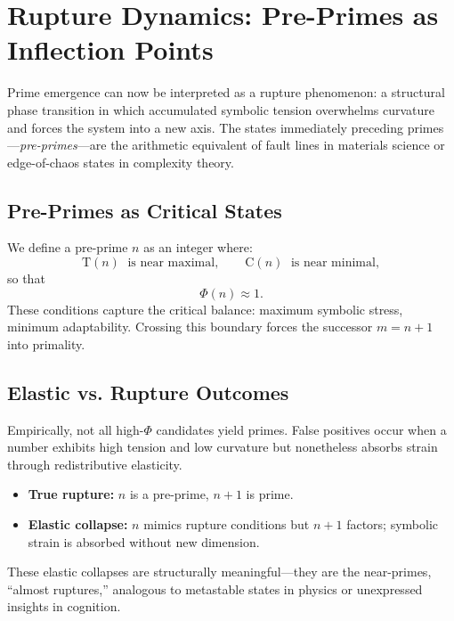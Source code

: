 \documentclass[11pt]{article}
\theoremstyle{plain}
\theoremstyle{definition}
\newcommand{\tension}{\mathrm{T}}                           %
\newcommand{\curv}{\mathrm{C}}                              %
\newcommand{\phidet}{\Phi}                                  %
\begin{document}
\section{Rupture Dynamics: Pre-Primes as Inflection Points}

Prime emergence can now be interpreted as a rupture phenomenon: a structural phase transition in which accumulated symbolic tension overwhelms curvature and forces the system into a new axis. The states immediately preceding primes—\emph{pre-primes}—are the arithmetic equivalent of fault lines in materials science or edge-of-chaos states in complexity theory.

\subsection{Pre-Primes as Critical States}
We define a pre-prime $n$ as an integer where:
\[
\tension(n) \;\text{ is near maximal}, \qquad \curv(n) \;\text{ is near minimal},
\]
so that
\[
\phidet(n) \approx 1.
\]
These conditions capture the critical balance: maximum symbolic stress, minimum adaptability. Crossing this boundary forces the successor $m=n+1$ into primality.

\subsection{Elastic vs. Rupture Outcomes}
Empirically, not all high-$\Phi$ candidates yield primes. False positives occur when a number exhibits high tension and low curvature but nonetheless absorbs strain through redistributive elasticity.  
\begin{itemize}
  \item \textbf{True rupture:} $n$ is a pre-prime, $n+1$ is prime.  
  \item \textbf{Elastic collapse:} $n$ mimics rupture conditions but $n+1$ factors; symbolic strain is absorbed without new dimension.
\end{itemize}
These elastic collapses are structurally meaningful—they are the near-primes, “almost ruptures,” analogous to metastable states in physics or unexpressed insights in cognition.
\end{document}
